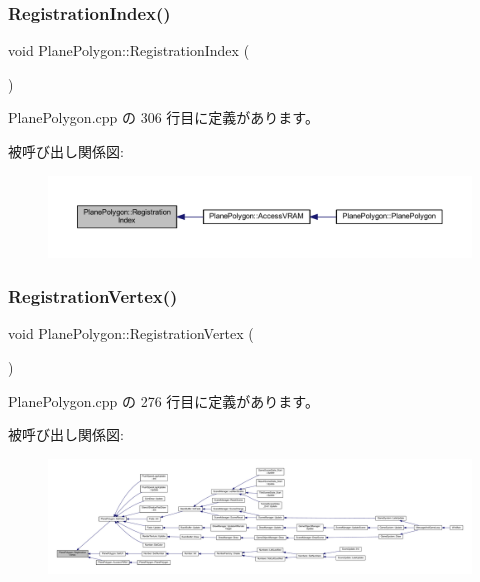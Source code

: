 \subsubsection{\texorpdfstring{Registration\+Index()}{RegistrationIndex()}}
{\footnotesize\ttfamily void Plane\+Polygon\+::\+Registration\+Index (\begin{DoxyParamCaption}{ }\end{DoxyParamCaption})\hspace{0.3cm}{\ttfamily [private]}}



 Plane\+Polygon.\+cpp の 306 行目に定義があります。

被呼び出し関係図\+:\nopagebreak
\begin{figure}[H]
\begin{center}
\leavevmode
\includegraphics[width=350pt]{class_plane_polygon_a535d0222908f4a4a030d8b525b225554_icgraph}
\end{center}
\end{figure}
\mbox{\label{class_plane_polygon_af4ba95cfaf0aba506eeb58cdc80bfd46}} 
\subsubsection{\texorpdfstring{Registration\+Vertex()}{RegistrationVertex()}}
{\footnotesize\ttfamily void Plane\+Polygon\+::\+Registration\+Vertex (\begin{DoxyParamCaption}{ }\end{DoxyParamCaption})\hspace{0.3cm}{\ttfamily [private]}}



 Plane\+Polygon.\+cpp の 276 行目に定義があります。

被呼び出し関係図\+:
\nopagebreak
\begin{figure}[H]
\begin{center}
\leavevmode
\includegraphics[width=350pt]{class_plane_polygon_af4ba95cfaf0aba506eeb58cdc80bfd46_icgraph}
\end{center}
\end{figure}
\mbox{\label{class_plane_polygon_a55307fc341641d7fd42fe2269acbd113}} 
